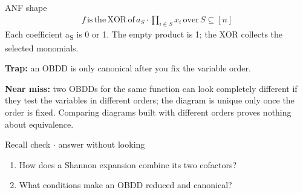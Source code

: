 \documentclass[11pt]{article}
\begin{document}
\begin{keepsection}
\begin{equationcard}{ANF shape}
\[ \begin{gathered} {f}\, \text{is}\, \text{the}\, \text{XOR}\, \text{of}\, {a}_{{S}}\cdot \prod_{{i}\in {S}} {x}_{{i}}\, \text{over}\, {S}⊆[{n}] \end{gathered} \]
{\small Each coefficient a\textsubscript{S} is 0 or 1. The empty product is 1; the XOR collects the selected monomials.}
\end{equationcard}

\begin{notebox}\textbf{Trap:} an OBDD is only canonical after you fix the variable order.\end{notebox}

\begin{notebox}\textbf{Near miss:} two OBDDs for the same function can look completely different if they test the variables in different orders; the diagram is unique only once the order is fixed. Comparing diagrams built with different orders proves nothing about equivalence.\end{notebox}

\begin{recallbox}{Recall check \ensuremath{\cdot} answer without looking}
\begin{enumerate}
\item How does a Shannon expansion combine its two cofactors?
\item What conditions make an OBDD reduced and canonical?
\end{enumerate}

\end{recallbox}
\end{keepsection}
\end{document}
